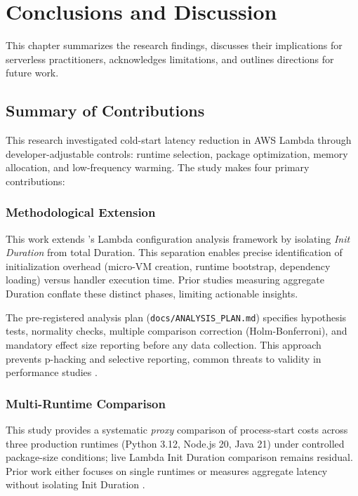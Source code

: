 \chapter{Conclusions and Discussion}
\label{ch:conclusions}

This chapter summarizes the research findings, discusses their implications for serverless practitioners, acknowledges limitations, and outlines directions for future work.

\section{Summary of Contributions}

This research investigated cold-start latency reduction in AWS Lambda through developer-adjustable controls: runtime selection, package optimization, memory allocation, and low-frequency warming. The study makes four primary contributions:

\subsection{Methodological Extension}

This work extends \citet{bluemke2025ijet}'s Lambda configuration analysis framework by isolating \textit{Init Duration} from total Duration. This separation enables precise identification of initialization overhead (micro-VM creation, runtime bootstrap, dependency loading) versus handler execution time. Prior studies measuring aggregate Duration conflate these distinct phases, limiting actionable insights.

The pre-registered analysis plan (\texttt{docs/ANALYSIS\_PLAN.md}) specifies hypothesis tests, normality checks, multiple comparison correction (Holm-Bonferroni), and mandatory effect size reporting before any data collection. This approach prevents p-hacking and selective reporting, common threats to validity in performance studies \citep{wen2025variance}.

\subsection{Multi-Runtime Comparison}

This study provides a systematic \textit{proxy} comparison of process-start costs across three production runtimes (Python 3.12, Node.js 20, Java 21) under controlled package-size conditions; live Lambda Init Duration comparison remains residual. Prior work either focuses on single runtimes \citep{bluemke2025ijet} or measures aggregate latency without isolating Init Duration \citep{wen2023characterizing}.

